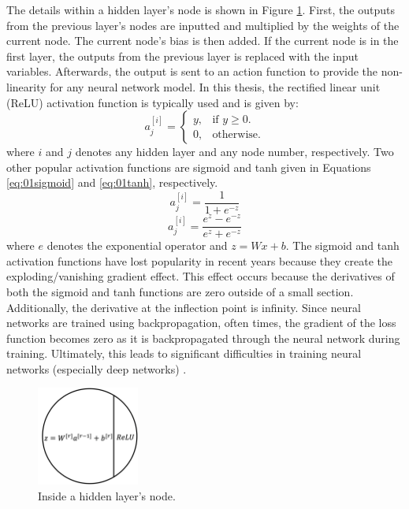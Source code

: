 The details within a hidden layer's node is shown in Figure \ref{fig:08NNNode}. First, the outputs from the previous layer's nodes are inputted and multiplied by the weights of the current node.  The current node's bias is then added. If the current node is in the first layer, the outputs from the previous layer is replaced with the input variables. Afterwards, the output is sent to an action function to provide the non-linearity for any neural network model.  In this thesis, the rectified linear unit (ReLU) activation function is typically used and is given by:
\begin{equation}
    a^{[i]}_j=\begin{cases}
        y, & \text{if $y\geq0$}.\\
        0, & \text{otherwise}.
    \end{cases}
    \label{eq:08ReLU}
\end{equation}
where $i$ and $j$ denotes any hidden layer and any node number, respectively.  Two other popular activation functions are sigmoid and tanh given in Equations \ref{eq:01sigmoid} and \ref{eq:01tanh}, respectively.
\begin{equation}
    a^{[i]}_j = \frac{1}{1 + e^{-z}}
    \label{eq:01sigmoid}
\end{equation}
\begin{equation}
    a^{[i]}_j = \frac{e^z - e^{-z}}{e^z + e^{-z}}
    \label{eq:01tanh}
\end{equation}
where $e$ denotes the exponential operator and $z = Wx + b$. The sigmoid and tanh activation functions have lost popularity in recent years because they create the exploding/vanishing gradient effect.  This effect occurs because the derivatives of both the sigmoid and tanh functions are zero outside of a small section.  Additionally, the derivative at the inflection point is infinity.  Since neural networks are trained using backpropagation, often times, the gradient of the loss function becomes zero as it is backpropagated through the neural network during training.  Ultimately, this leads to significant difficulties in training neural networks (especially deep networks) \cite{vanish_grad}.  

\begin{figure}[h]
    \centering
    \includegraphics[width=0.3\textwidth]{images/ch1/08NNNode.png}
    \caption{Inside a hidden layer's node.}
    \label{fig:08NNNode}
\end{figure}


